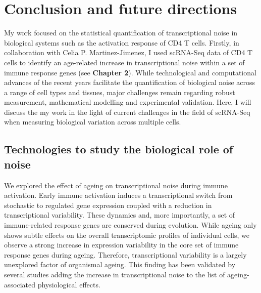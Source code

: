 
\chapter{Conclusion and future directions}  

\vspace{-5mm}

My work focused on the statistical quantification of transcriptional noise in biological systems such as the activation response of CD4\plus{} T cells. Firstly, in collaboration with Celia P. Martinez-Jimenez, I used scRNA-Seq data of CD4\plus{} T cells to identify an age-related increase in transcriptional noise within a set of immune response genes (see \textbf{Chapter 2}).   
While technological and computational advances of the recent years facilitate the quantification of biological noise across a range of cell types and tissues, major challenges remain regarding robust measurement, mathematical modelling and experimental validation. Here, I will discuss the my work in the light of current challenges in the field of scRNA-Seq when measuring biological variation across multiple cells.

\newpage

\section{Technologies to study the biological role of noise}

We explored the effect of ageing on transcriptional noise during immune activation. Early immune activation induces a transcriptional switch from stochastic to regulated gene expression coupled with a reduction in transcriptional variability. These dynamics and, more importantly, a set of immune-related response genes are conserved during evolution. While ageing only shows subtle effects on the overall transcriptomic profiles of individual cells, we observe a strong increase in expression variability in the core set of immune response genes during ageing. Therefore, transcriptional variability is a largely unexplored factor of organismal ageing. This finding has been validated by several studies \citep{Enge2017, Angelidis2018, Cheung2018} adding the increase in transcriptional noise to the list of ageing-associated physiological effects.\\

